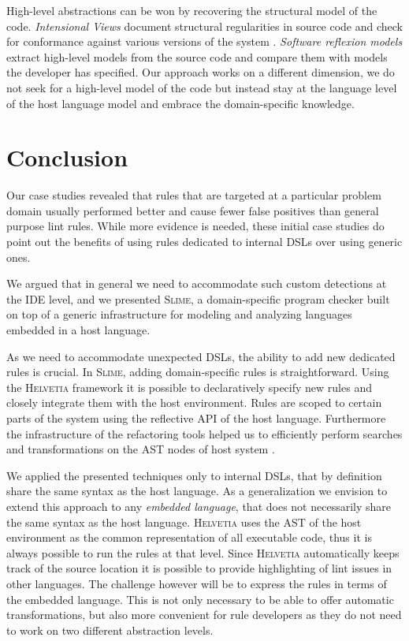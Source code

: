 \documentclass[10pt,twocolumn]{article}
\newcommand{\Slime}{\textsc{Slime}\xspace}
\newcommand{\Helvetia}{\textsc{Helvetia}\xspace}
\begin{document}
High-level abstractions can be won by recovering the structural model of the code. \emph{Intensional Views} document structural regularities in source code and check for conformance against various versions of the system \cite{Mens06a}. \emph{Software reflexion models} extract high-level models from the source code and compare them with models the developer has specified. Our approach works on a different dimension, we do not seek for a high-level model of the code but instead stay at the language level of the host language model and embrace the domain-specific knowledge.

\section{Conclusion}\label{sec:conclusion}

Our case studies revealed that rules that are targeted at a particular problem domain usually performed better and cause fewer false positives than general purpose lint rules. While more evidence is needed, these initial case studies do point out the benefits of using rules dedicated to internal DSLs over using generic ones.

We argued that in general we need to accommodate such custom detections at the IDE level, and we presented \Slime, a domain-specific program checker built on top of a generic infrastructure for modeling and analyzing languages embedded in a host language.

As we need to accommodate unexpected DSLs, the ability to add new dedicated rules is crucial. In \Slime, adding domain-specific rules is straightforward. Using the \Helvetia framework it is possible to declaratively specify new rules and closely integrate them with the host environment. Rules are scoped to certain parts of the system using the reflective API of the host language. Furthermore the infrastructure of the refactoring tools helped us to efficiently perform searches and transformations on the AST nodes of host system \cite{Denk07b}.

We applied the presented techniques only to internal DSLs, that by definition share the same syntax as the host language. As a generalization we envision to extend this approach to any \emph{embedded language}, that does not necessarily share the same syntax as the host language. \Helvetia uses the AST of the host environment as the common representation of all executable code, thus it is always possible to run the rules at that level. Since \Helvetia automatically keeps track of the source location it is possible to provide highlighting of lint issues in other languages. The challenge however will be to express the rules in terms of the embedded language. This is not only necessary to be able to offer automatic transformations, but also more convenient for rule developers as they do not need to work on two different abstraction levels.
\end{document}
